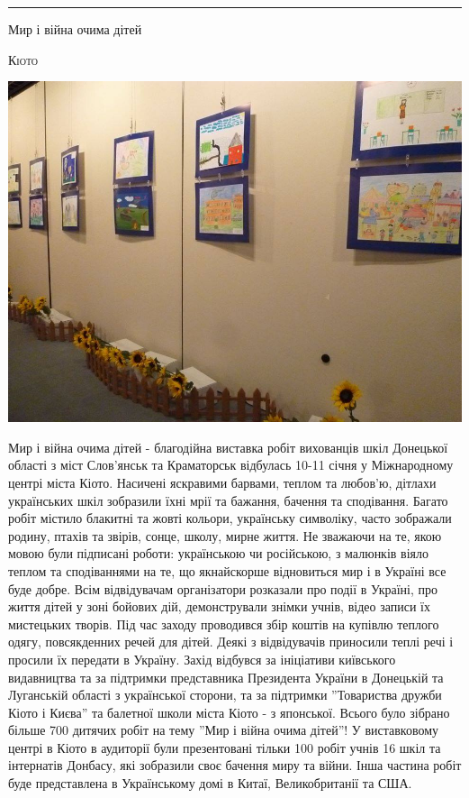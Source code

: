 \documentclass[10pt,a4paper]{article}
\newcommand{\SepRule}{\noindent							 %
						\begin{center}
							\rule{250pt}{1pt}
						\end{center}
						}
\newcommand{\NewsItem}[1]{%
		\usefont{T2A}{iwona}{m}{n} 
		\large #1 \vspace{4pt}
		\par \normalsize \normalfont}
\newcommand{\NewsAuthor}[1]{%
			\hfill \textsc{#1} \vspace{4pt}
			\par \normalfont}
\begin{document}
\vspace{0.5cm}
	\SepRule
\vspace{0.5cm}
\begin{multicols}{3}

\vspace{1cm}
\NewsItem{Мир і війна очима дітей}
\NewsAuthor{Кіото}
		\begin{center}
			\includegraphics[width=0.8\linewidth]{images/war-and-peace}
		\end{center}
Мир і війна очима дітей - благодійна виставка робіт вихованців шкіл Донецької області з міст Слов'янськ та Краматорськ відбулась 10-11 січня у Міжнародному центрі міста Кіото.
Насичені яскравими барвами, теплом та любов'ю, дітлахи українських шкіл зобразили їхні мрії та бажання, бачення та сподівання. Багато робіт містило блакитні та жовті кольори, українську символіку, часто зображали родину, птахів та звірів, сонце, школу, мирне життя. Не зважаючи на те, якою мовою були підписані роботи: українською чи російською, з малюнків віяло теплом та сподіваннями на те, що якнайскорше відновиться мир і в Україні все буде добре.
Всім відвідувачам організатори розказали про події в Україні, про життя дітей у зоні бойових дій, демонстрували знімки учнів, відео записи їх мистецьких творів. 
Під час заходу проводився збір коштів на купівлю теплого одягу, повсякденних речей для дітей. Деякі з відвідувачів приносили теплі речі і просили їх передати в Україну.
Захід відбувся за ініціативи київського видавництва та за підтримки представника Президента України в Донецькій та Луганській області з української сторони, та за підтримки ''Товариства дружби Кіото і Києва'' та балетної школи міста Кіото - з японської. Всього було зібрано більше 700 дитячих робіт на тему ''Мир і війна очима дітей''! У виставковому центрі в Кіото в аудиторії були презентовані тільки 100 робіт учнів 16 шкіл та інтернатів Донбасу, які зобразили своє бачення миру та війни. Інша частина робіт буде представлена в Українському домі в Китаї, Великобританії та США.

\end{multicols}
\end{document}
